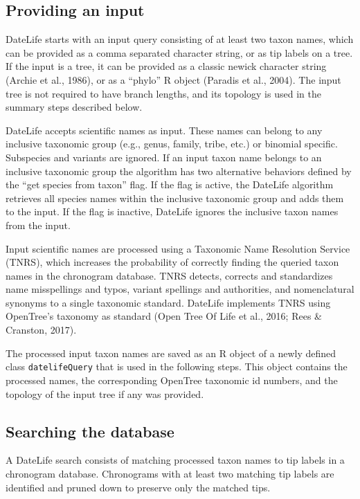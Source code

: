 \documentclass[
  english,
  man]{apa6}
\begin{document}
\hypertarget{providing-an-input}{%
\subsection{Providing an input}\label{providing-an-input}}

DateLife starts with an input query consisting of at least two taxon names, which can be provided as a comma separated character string, or as tip labels on a tree. If the input is a tree, it can be provided as a classic newick character string (Archie et al., 1986), or as a ``phylo'' R object (Paradis et al., 2004). The input tree is not required to have branch lengths, and its topology is used in the summary steps described below.

DateLife accepts scientific names as input.
These names can belong to any inclusive taxonomic group (e.g., genus, family, tribe, etc.) or binomial specific. Subspecies and variants are ignored. If an input taxon name belongs to an inclusive taxonomic group the algorithm has two alternative behaviors defined by the ``get species from taxon'' flag. If the flag is active, the DateLife algorithm retrieves all species names within the inclusive taxonomic group and adds them to the input. If the flag is inactive, DateLife ignores the inclusive taxon names from the input.

Input scientific names are processed using a Taxonomic Name Resolution Service (TNRS), which increases the probability of correctly finding the queried taxon names in the chronogram database. TNRS detects, corrects and standardizes name misspellings and typos, variant spellings and authorities, and nomenclatural synonyms to a single taxonomic standard. DateLife implements TNRS using OpenTree's taxonomy as standard (Open Tree Of Life et al., 2016; Rees \& Cranston, 2017).

The processed input taxon names are saved as an R object of a newly defined class \texttt{datelifeQuery} that is used in the following steps. This object contains the processed names, the corresponding OpenTree taxonomic id numbers, and the topology of the input tree if any was provided.

\hypertarget{searching-the-database}{%
\subsection{Searching the database}\label{searching-the-database}}

A DateLife search consists of matching processed taxon names to tip labels in a chronogram database. Chronograms with at least two matching tip labels are identified and pruned down to preserve only the matched tips.
\end{document}
